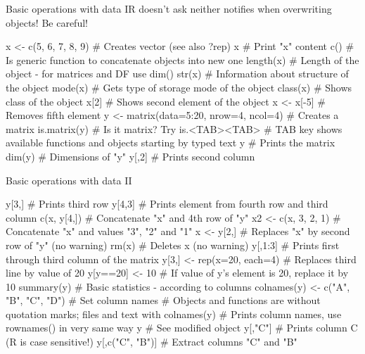 \documentclass[compress, xelatex, 11pt, xcolor=svgnames, aspectratio=169,
	hyperref={
		bookmarks=true,
		unicode=true,
		colorlinks=true,
		pdftitle={Molecular data in R},
		plainpages=false,
		pdfauthor={Vojtech Zeisek},
		pdfsubject={Course about phylogeny and evolution in R},
		pdfcreator={XeLaTeX},
		pdfkeywords={R, evolution, phylogeny, molecular data},
		linkcolor=Crimson, %
		anchorcolor=Magenta, %
		citecolor=Magenta, %
		filecolor=Magenta, %
		menucolor=Magenta, %
		urlcolor=DodgerBlue, %
		},
	url={hyphens, lowtilde} %
	]{beamer}
\begin{document}
\begin{frame}[fragile]{Basic operations with data I}{\alert{R doesn't ask neither notifies when overwriting objects! Be careful!}}
	\begin{spluscode}
    x <- c(5, 6, 7, 8, 9) # Creates vector (see also ?rep)
    x # Print "x" content
    c() # Is generic function to concatenate objects into new one
    length(x) # Length of the object - for matrices and DF use dim()
    str(x) # Information about structure of the object
    mode(x) # Gets type of storage mode of the object
    class(x) # Shows class of the object
    x[2] # Shows second element of the object
    x <- x[-5] # Removes fifth element
    y <- matrix(data=5:20, nrow=4, ncol=4) # Creates a matrix
    is.matrix(y) # Is it matrix? Try is.<TAB><TAB>
    # TAB key shows available functions and objects starting by typed text
    y # Prints the matrix
    dim(y) # Dimensions of "y"
    y[,2] # Prints second column
	\end{spluscode}
\end{frame}

\begin{frame}[fragile]{Basic operations with data II}
	\begin{spluscode}
    y[3,] # Prints third row
    y[4,3] # Prints element from fourth row and third column
    c(x, y[4,]) # Concatenate "x" and 4th row of "y"
    x2 <- c(x, 3, 2, 1) # Concatenate "x" and values "3", "2" and "1"
    x <- y[2,] # Replaces "x" by second row of "y" (no warning)
    rm(x) # Deletes x (no warning)
    y[,1:3] # Prints first through third column of the matrix
    y[3,] <- rep(x=20, each=4) # Replaces third line by value of 20
    y[y==20] <- 10 # If value of y's element is 20, replace it by 10
    summary(y) # Basic statistics - according to columns
    colnames(y) <- c("A", "B", "C", "D") # Set column names
    # Objects and functions are without quotation marks; files and text with
    colnames(y) # Prints column names, use rownames() in very same way
    y # See modified object
    y[,"C"] # Prints column C (R is case sensitive!)
    y[,c("C", "B")] # Extract columns "C" and "B"
	\end{spluscode}
\end{frame}
\end{document}

